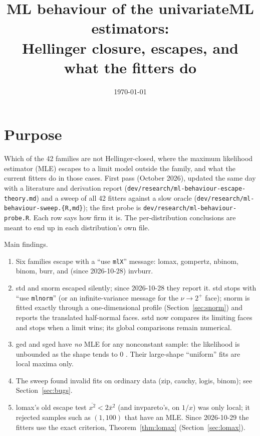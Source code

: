 \documentclass[11pt]{article}
\title{ML behaviour of the univariateML estimators:\\ Hellinger closure, escapes, and what the fitters do}
\author{}
\date{\today}
\newcommand{\code}[1]{\texttt{#1}}
\theoremstyle{plain}
\theoremstyle{definition}
\theoremstyle{remark}
\begin{document}
\maketitle

\section*{Purpose}

Which of the 42 families are not Hellinger-closed, where the maximum
likelihood estimator (MLE) escapes to a limit model outside the family, and
what the current fitters do in those cases. First pass (October 2026),
updated the same day with a literature and derivation report
(\code{dev/research/ml-behaviour-escape-theory.md}) and a sweep of all 42 fitters
against a slow oracle (\code{dev/research/ml-behaviour-sweep.\{R,md\}}); the first
probe is \code{dev/research/ml-behaviour-probe.R}. Each row says how firm it is. The
per-distribution conclusions are meant to end up in each distribution's own
file.

Main findings.
\begin{enumerate}
  \item Six families escape with a ``use \code{mlX}'' message: lomax,
    gompertz, nbinom, binom, burr, and (since 2026-10-28) invburr.
  \item std and snorm escaped silently; since 2026-10-28 they report it.
    std stops with ``use \code{mlnorm}'' (or an infinite-variance message
    for the $\nu\to2^+$ face); snorm is fitted exactly through a
    one-dimensional profile (Section~\ref{sec:snorm}) and reports the
    translated half-normal faces. sstd now compares its limiting faces and
    stops when a limit wins; its global comparisons remain numerical.
  \item ged and sged have \emph{no} MLE for any nonconstant sample: the
    likelihood is unbounded as the shape tends to $0$ \cite{tumlinson2015}.
    Their large-shape ``uniform'' fits are local maxima only.
  \item The sweep found invalid fits on ordinary data (zip, cauchy, logis,
    binom); see Section~\ref{sec:bugs}.
  \item lomax's old escape test $\overline{x^2} < 2\bar x^2$ (and
    invpareto's, on $1/x$) was only local; it rejected samples such as
    $(1, 100)$ that have an MLE. Since 2026-10-29 the fitters use the exact
    criterion, Theorem~\ref{thm:lomax} (Section~\ref{sec:lomax}).
\end{enumerate}
\end{document}

